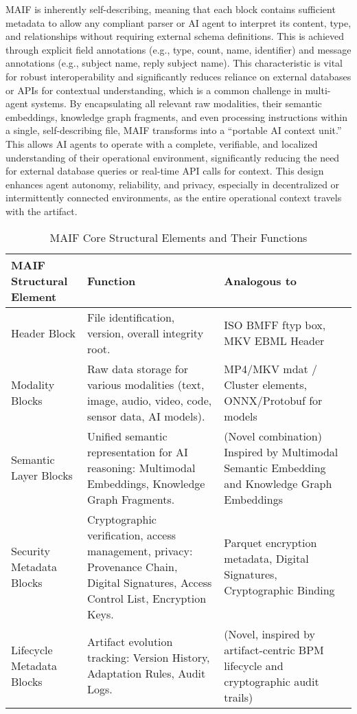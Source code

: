 \documentclass[conference]{IEEEtran}
\begin{document}
MAIF is inherently self-describing, meaning that each block contains sufficient metadata to allow any compliant parser or AI agent to interpret its content, type, and relationships without requiring external schema definitions\cite{ref62}. This is achieved through explicit field annotations (e.g., type, count, name, identifier) and message annotations (e.g., subject name, reply subject name)\cite{ref62}. This characteristic is vital for robust interoperability and significantly reduces reliance on external databases or APIs for contextual understanding, which is a common challenge in multi-agent systems\cite{ref23}. By encapsulating all relevant raw modalities, their semantic embeddings, knowledge graph fragments, and even processing instructions within a single, self-describing file, MAIF transforms into a ``portable AI context unit.'' This allows AI agents to operate with a complete, verifiable, and localized understanding of their operational environment, significantly reducing the need for external database queries or real-time API calls for context. This design enhances agent autonomy, reliability, and privacy, especially in decentralized or intermittently connected environments, as the entire operational context travels with the artifact.

\begin{table*}[!t]
\renewcommand{\arraystretch}{1.3}
\caption{MAIF Core Structural Elements and Their Functions}
\label{tab:maif-structure}
\centering
\footnotesize
\begin{tabular}{p{3.5cm}p{6cm}p{4cm}}
\toprule
\textbf{MAIF Structural Element} & \textbf{Function} & \textbf{Analogous to} \\
\midrule
Header Block & File identification, version, overall integrity root. & ISO BMFF ftyp box\cite{ref32}, MKV EBML Header\cite{ref37} \\
Modality Blocks & Raw data storage for various modalities (text, image, audio, video, code, sensor data, AI models). & MP4/MKV mdat / Cluster elements\cite{ref35}, ONNX/Protobuf for models\cite{ref41} \\
Semantic Layer Blocks & Unified semantic representation for AI reasoning: Multimodal Embeddings, Knowledge Graph Fragments. & (Novel combination) Inspired by Multimodal Semantic Embedding\cite{ref26} and Knowledge Graph Embeddings\cite{ref43} \\
Security Metadata Blocks & Cryptographic verification, access management, privacy: Provenance Chain, Digital Signatures, Access Control List, Encryption Keys. & Parquet encryption metadata\cite{ref64}, Digital Signatures\cite{ref65}, Cryptographic Binding\cite{ref66} \\
Lifecycle Metadata Blocks & Artifact evolution tracking: Version History, Adaptation Rules, Audit Logs. & (Novel, inspired by artifact-centric BPM lifecycle\cite{ref12} and cryptographic audit trails\cite{ref9}) \\
\bottomrule
\end{tabular}
\end{table*}
\end{document}
